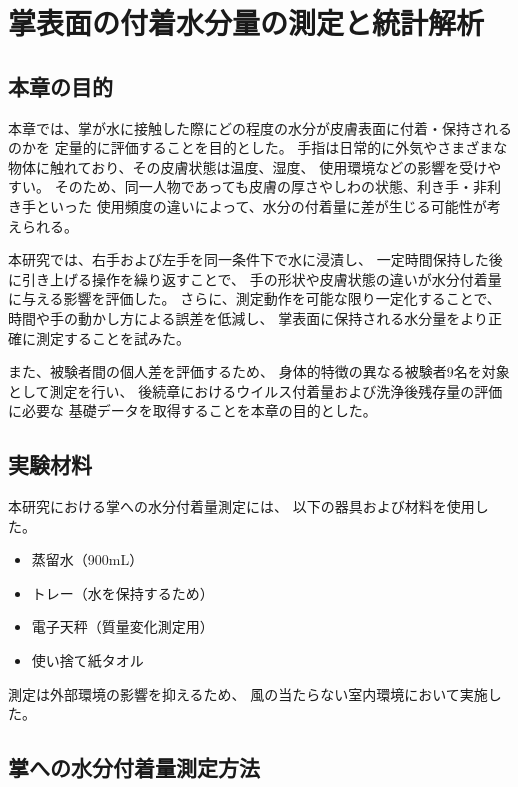 \chapter{掌表面の付着水分量の測定と統計解析}

\section{本章の目的}

本章では、掌が水に接触した際にどの程度の水分が皮膚表面に付着・保持されるのかを
定量的に評価することを目的とした。
手指は日常的に外気やさまざまな物体に触れており、その皮膚状態は温度、湿度、
使用環境などの影響を受けやすい。
そのため、同一人物であっても皮膚の厚さやしわの状態、利き手・非利き手といった
使用頻度の違いによって、水分の付着量に差が生じる可能性が考えられる。

本研究では、右手および左手を同一条件下で水に浸漬し、
一定時間保持した後に引き上げる操作を繰り返すことで、
手の形状や皮膚状態の違いが水分付着量に与える影響を評価した。
さらに、測定動作を可能な限り一定化することで、
時間や手の動かし方による誤差を低減し、
掌表面に保持される水分量をより正確に測定することを試みた。

また、被験者間の個人差を評価するため、
身体的特徴の異なる被験者9名を対象として測定を行い、
後続章におけるウイルス付着量および洗浄後残存量の評価に必要な
基礎データを取得することを本章の目的とした。


\section{実験材料}

本研究における掌への水分付着量測定には、
以下の器具および材料を使用した。

\begin{itemize}
  \item 蒸留水（900mL）
  \item トレー（水を保持するため）
  \item 電子天秤（質量変化測定用）
  \item 使い捨て紙タオル
\end{itemize}

測定は外部環境の影響を抑えるため、
風の当たらない室内環境において実施した。


\section{掌への水分付着量測定方法}

